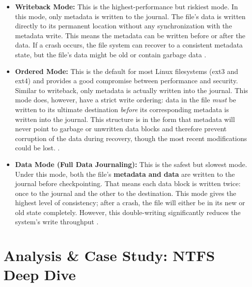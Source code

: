 \documentclass[12pt]{article}
\begin{document}
\begin{itemize}
    \item \textbf{Writeback Mode:} This is the highest-performance but riskiest mode. In this mode, only metadata is written to the journal. The file's data is written directly to its permanent location without any synchronization with the metadata write. This means the metadata can be written before or after the data. If a crash occurs, the file system can recover to a consistent metadata state, but the file's data might be old or contain garbage data \parencite{Jones2008Anatomy}.

    \item \textbf{Ordered Mode:} This is the default for most Linux filesystems (ext3 and ext4) and provides a good compromise between performance and security. Similar to writeback, only metadata is actually written into the journal. This mode does, however, have a strict write ordering: data in the file \textit{must} be written to its ultimate destination \textit{before} its corresponding metadata is written into the journal. This structure is in the form that metadata will never point to garbage or unwritten data blocks and therefore prevent corruption of the data during recovery, though the most recent modifications could be lost. \parencite{Prabhakaran2005journaling}.

    \item \textbf{Data Mode (Full Data Journaling):} This is the safest but slowest mode. Under this mode, both the file's \textbf{metadata and data} are written to the journal before checkpointing. That means each data block is written twice: once to the journal and the other to the destination. This mode gives the highest level of consistency; after a crash, the file will either be in its new or old state completely. However, this double-writing significantly reduces the system's write throughput \parencite{Jones2008Anatomy}.
\end{itemize}




\section{Analysis \& Case Study: NTFS Deep Dive}

\end{document}
